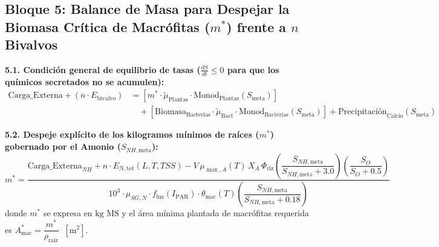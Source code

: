 \documentclass[11pt,letterpaper]{article}
\begin{document}
\subsection{Bloque 5: Balance de Masa para Despejar la Biomasa Crítica de Macrófitas ($m^*$) frente a $n$ Bivalvos}

\begin{formulabox}
\textbf{5.1. Condición general de equilibrio de tasas ($\frac{dS}{dt} \le 0$ para que los químicos secretados no se acumulen):}
\begin{equation}
\begin{aligned}
\text{Carga\_Externa} + \left(n \cdot E_{\text{bivalvo}}\right) &= \left[m^* \cdot \tilde{\mu}_{\text{Plantas}} \cdot \text{Monod}_{\text{Plantas}}(S_{\text{meta}})\right] \\
&\quad + \left[\text{Biomasa}_{\text{Bacterias}} \cdot \tilde{\mu}_{\text{Bact}} \cdot \text{Monod}_{\text{Bacterias}}(S_{\text{meta}})\right] + \text{Precipitación}_{\text{Calcio}}(S_{\text{meta}})
\end{aligned}
\label{eq:balance_usuario}
\end{equation}

\textbf{5.2. Despeje explícito de los kilogramos mínimos de raíces ($m^*$) gobernado por el Amonio ($S_{NH,\text{meta}}$):}
\begin{equation}
m^* = \frac{\text{Carga\_Externa}_{NH} + n \cdot E_{N,\text{tot}}(L, T, TSS) - V \, \mu_{\max,A}(T) \, X_A \, \Phi_{\text{riz}} \!\left(\dfrac{S_{NH,\text{meta}}}{S_{NH,\text{meta}} + 3.0}\right)\!\left(\dfrac{S_O}{S_O + 0.5}\right)}{10^3 \cdot \mu_{SG,N} \cdot f_{\text{luz}}(I_{\text{PAR}}) \cdot \theta_{\text{mac}}(T) \!\left(\dfrac{S_{NH,\text{meta}}}{S_{NH,\text{meta}} + 0.18}\right)}
\label{eq:mstar}
\end{equation}
donde $m^*$ se expresa en $\text{kg MS}$ y el área mínima plantada de macrófitas requerida es $A_{\text{mac}}^* = \dfrac{m^*}{\rho_{\text{raiz}}} \;\; [\text{m}^2]$.
\end{formulabox}
\end{document}
